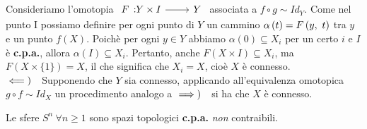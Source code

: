 \begin{demonstration}
\begin{enumerate}[label=\Roman*]
Consideriamo l'omotopia $\funz{F}{Y\times I}{Y}$ associata a $f\circ g\sim Id_Y$. Come nel punto I possiamo definire per ogni punto di $Y$ un cammino $\alpha\left(t\right)=F\left(y,\ t\right)$ tra $y$ e un punto $f\left(X\right)$. Poichè per ogni $y\in Y$ abbiamo $\alpha\left(0\right)\subseteq X_i$ per un certo $i$ e $I$ è \textbf{c.p.a.}, allora $\alpha\left(I\right)\subseteq X_i$. Pertanto, anche $F\left(X\times I\right)\subseteq X_i$, ma $F\left(X\times\{1\}\right)=X$, il che significa che $X_i=X$, cioè $X$ è connesso.\\ 
$\impliedby)\quad$Supponendo che $Y$ sia connesso, applicando all'equivalenza omotopica $g\circ f\sim Id_X$ un procedimento analogo a $\implies)\quad$si ha che $X$ è connesso.
\end{enumerate}
\vspace{-6mm}
	\end{demonstration}
\begin{example}
	Le sfere $S^n\ \forall n\geq 1$ sono spazi topologici \textbf{c.p.a.} \textit{non} contraibili.
\end{example}
